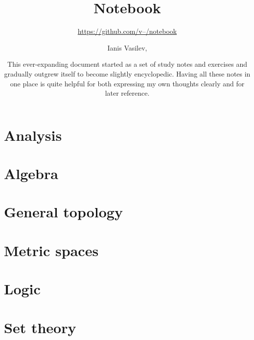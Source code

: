 \documentclass[numbers=endperiod, bibliography=totocnumbered, oneside]{scrbook}
\title{Notebook}
\subtitle{\href{https://github.com/v--/notebook}{https://github.com/v--/notebook}}
\author{Ianis Vasilev, \Email{ianis@ivasilev.net}}
\date{\justify
  This ever-expanding document started as a set of study notes and exercises and gradually outgrew itself to become slightly encyclopedic. Having all these notes in one place is quite helpful for both expressing my own thoughts clearly and for later reference.
}
\begin{document}
\hfuzz=2pt
\maketitle
\tableofcontents

\chapter{Analysis}\label{ch:analysis}










\chapter{Algebra}\label{ch:algebra}






\chapter{General topology}\label{ch:general_topology}








\chapter{Metric spaces}\label{ch:metric_spaces}





\chapter{Logic}\label{ch:logic}





\chapter{Set theory}\label{ch:set_theory}




\end{document}
